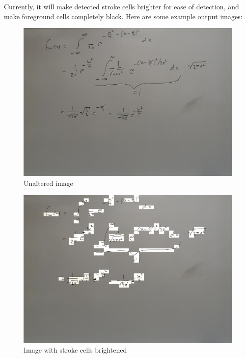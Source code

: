 \documentclass[]{article}
\begin{document}
Currently, it will make detected stroke cells brighter for ease of detection, and make foreground cells completely black.  Here are some example output images:


\begin{figure}[H]
\centering
\includegraphics[scale=0.15]{images/wb_nickel_7_crop}
\caption{Unaltered image}
\end{figure}

\begin{figure}[H]
\centering
\includegraphics[scale=0.15]{images/cell_id_demo}
\caption{Image with stroke cells brightened}
\end{figure}
\end{document}

